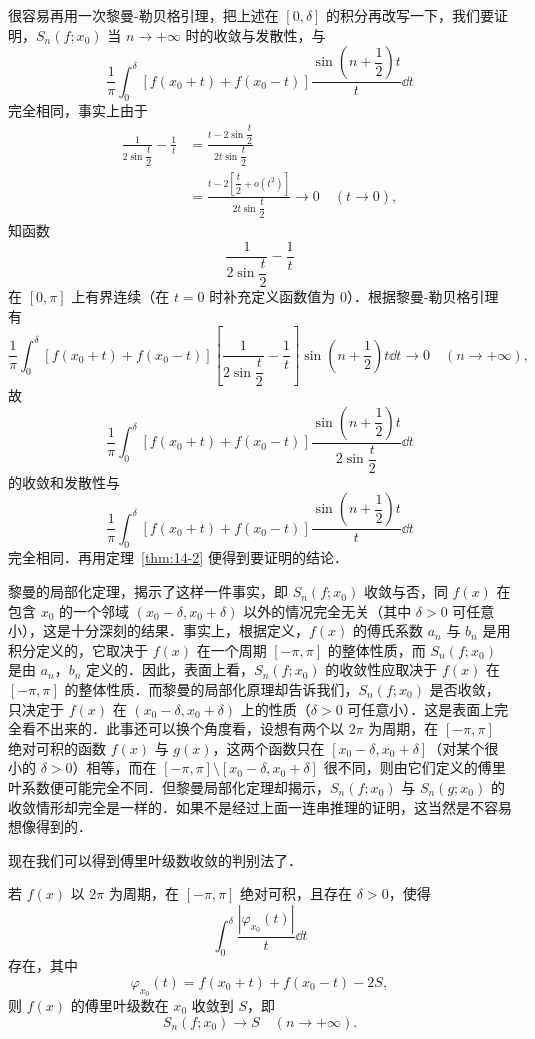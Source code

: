 很容易再用一次黎曼-勒贝格引理，把上述在 $[0,\delta]$ 的积分再改写一下，我们要证明，$S_{n}(f;x_{0})$ 当 $n\to+\infty$ 时的收敛与发散性，与
\[
\frac{1}{\pi}\int_{0}^{\delta}\left[f(x_{0}+t)+f(x_{0}-t)\right]\frac{\sin\left(n+\dfrac{1}{2}\right)t}{t}\dd t
\]
完全相同，事实上由于
\[
\begin{aligned}
\frac{1}{2\sin\dfrac{t}{2}}-\frac{1}{t}&=\frac{t-2\sin\dfrac{t}{2}}{2t\sin\dfrac{t}{2}}\\
&=\frac{t-2\left[\dfrac{t}{2}+o\left(t^{2}\right)\right]}{2t\sin\dfrac{t}{2}}\to 0\quad(t\to 0),
\end{aligned}
\]
知函数
\[
\frac{1}{2\sin\dfrac{t}{2}}-\frac{1}{t}
\]
在 $[0,\pi]$ 上有界连续（在 $t=0$ 时补充定义函数值为 $0$）．根据黎曼-勒贝格引理有
\[
\frac{1}{\pi}\int_{0}^{\delta}\left[f(x_{0}+t)+f(x_{0}-t)\right]\left[\frac{1}{2\sin\dfrac{t}{2}}-\frac{1}{t}\right]\sin\left(n+\frac{1}{2}\right)t\dd t\to 0\quad(n\to+\infty),
\]
故
\[
\frac{1}{\pi}\int_{0}^{\delta}\left[f(x_{0}+t)+f(x_{0}-t)\right]\frac{\sin\left(n+\dfrac{1}{2}\right)t}{2\sin\dfrac{t}{2}}\dd t
\]
的收敛和发散性与
\[
\frac{1}{\pi}\int_{0}^{\delta}\left[f(x_{0}+t)+f(x_{0}-t)\right]\frac{\sin\left(n+\dfrac{1}{2}\right)t}{t}\dd t
\]
完全相同．再用定理~\ref{thm:14-2} 便得到要证明的结论．

黎曼的局部化定理，揭示了这样一件事实，即 $S_{n}(f;x_{0})$ 收敛与否，同 $f(x)$ 在包含 $x_{0}$ 的一个邻域 $(x_{0}-\delta,x_{0}+\delta)$ 以外的情况完全无关（其中 $\delta>0$ 可任意小），这是十分深刻的结果．事实上，根据定义，$f(x)$ 的傅氏系数 $a_{n}$ 与 $b_{n}$ 是用积分定义的，它取决于 $f(x)$ 在一个周期 $[-\pi,\pi]$ 的整体性质，而 $S_{n}(f;x_{0})$ 是由 $a_{n}$，$b_{n}$ 定义的．因此，表面上看，$S_{n}(f;x_{0})$ 的收敛性应取决于 $f(x)$ 在 $[-\pi,\pi]$ 的整体性质．而黎曼的局部化原理却告诉我们，$S_{n}(f;x_{0})$ 是否收敛，只决定于 $f(x)$ 在 $(x_{0}-\delta,x_{0}+\delta)$ 上的性质（$\delta>0$ 可任意小）．这是表面上完全看不出来的．此事还可以换个角度看，设想有两个以 $2\pi$ 为周期，在 $[-\pi,\pi]$ 绝对可积的函数 $f(x)$ 与 $g(x)$，这两个函数只在 $[x_{0}-\delta,x_{0}+\delta]$（对某个很小的 $\delta>0$）相等，而在 $[-\pi,\pi]\setminus[x_{0}-\delta,x_{0}+\delta]$ 很不同，则由它们定义的傅里叶系数便可能完全不同．但黎曼局部化定理却揭示，$S_{n}(f;x_{0})$ 与 $S_{n}(g;x_{0})$ 的收敛情形却完全是一样的．如果不是经过上面一连串推理的证明，这当然是不容易想像得到的．

现在我们可以得到傅里叶级数收敛的判别法了．

\begin{theorem}[迪尼判别法]\label{thm:14-3}
若 $f(x)$ 以 $2\pi$ 为周期，在 $[-\pi,\pi]$ 绝对可积，且存在 $\delta>0$，使得
\[
\int_{0}^{\delta}\frac{\left|\varphi_{x_{0}}(t)\right|}{t}\dd t
\]
存在，其中
\[
\varphi_{x_{0}}(t)=f(x_{0}+t)+f(x_{0}-t)-2S,
\]
则 $f(x)$ 的傅里叶级数在 $x_{0}$ 收敛到 $S$，即
\[
S_{n}(f;x_{0})\to S\quad(n\to+\infty).
\]
\end{theorem}

